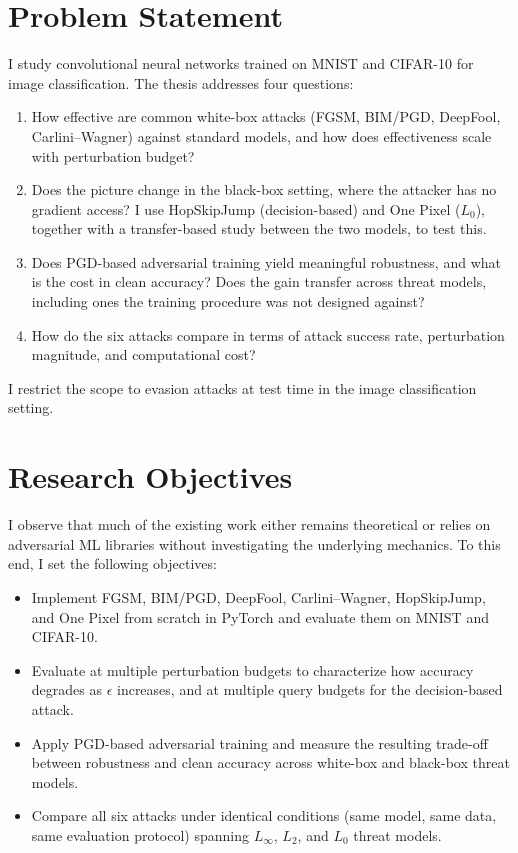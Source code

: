 \section{Problem Statement}

I study convolutional neural networks trained on MNIST and CIFAR-10 for image classification. The thesis addresses four questions:

\begin{enumerate}
    \item How effective are common white-box attacks (FGSM, BIM/PGD, DeepFool, Carlini--Wagner) against standard models, and how does effectiveness scale with perturbation budget?
    \item Does the picture change in the black-box setting, where the attacker has no gradient access? I use HopSkipJump (decision-based) and One Pixel ($L_0$), together with a transfer-based study between the two models, to test this.
    \item Does PGD-based adversarial training yield meaningful robustness, and what is the cost in clean accuracy? Does the gain transfer across threat models, including ones the training procedure was not designed against?
    \item How do the six attacks compare in terms of attack success rate, perturbation magnitude, and computational cost?
\end{enumerate}

I restrict the scope to evasion attacks at test time in the image classification setting.

\section{Research Objectives}

I observe that much of the existing work either remains theoretical or relies on adversarial ML libraries without investigating the underlying mechanics. To this end, I set the following objectives:

\begin{itemize}
    \item Implement FGSM, BIM/PGD, DeepFool, Carlini--Wagner, HopSkipJump, and One Pixel from scratch in PyTorch and evaluate them on MNIST and CIFAR-10.
    \item Evaluate at multiple perturbation budgets to characterize how accuracy degrades as $\epsilon$ increases, and at multiple query budgets for the decision-based attack.
    \item Apply PGD-based adversarial training and measure the resulting trade-off between robustness and clean accuracy across white-box and black-box threat models.
    \item Compare all six attacks under identical conditions (same model, same data, same evaluation protocol) spanning $L_\infty$, $L_2$, and $L_0$ threat models.
\end{itemize}

